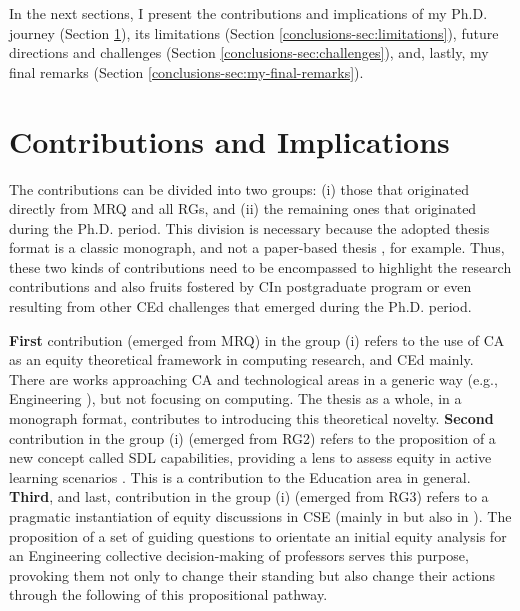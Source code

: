  In the next sections, I present the contributions and implications of my \gls{Ph.D.} journey (Section \ref{conclusions-sec:contrib-impl}), its limitations (Section \ref{conclusions-sec:limitations}), future directions and challenges (Section \ref{conclusions-sec:challenges}), and, lastly, my final remarks (Section \ref{conclusions-sec:my-final-remarks}).

 \section{Contributions and Implications}
 \label{conclusions-sec:contrib-impl}

The contributions can be divided into two groups: (i) those that originated directly from \gls{MRQ} and all \glspl{RG}, and (ii) the remaining ones that originated during the \gls{Ph.D.} period. This division is necessary because the adopted thesis format is a classic monograph, and not a paper-based thesis \cite{kubota:2021}, for example. Thus, these two kinds of contributions need to be encompassed to highlight the research contributions and also fruits fostered by \gls{CIn} postgraduate program or even resulting from other \gls{CEd} challenges that emerged during the \gls{Ph.D.} period.

\textbf{First} contribution (emerged from \gls{MRQ}) in the group (i) refers to the use of \gls{CA} as an equity theoretical framework in computing research, and \gls{CEd} mainly. There are works approaching \gls{CA} and technological areas in a generic way (e.g., Engineering \cite{fernandez:2014,odonovan:2020}), but not focusing on computing. The thesis as a whole, in a monograph format, contributes to introducing this theoretical novelty. \textbf{Second} contribution in the group (i) (emerged from \gls{RG}2) refers to the proposition of a new concept called \gls{SDL} capabilities, providing a lens to assess equity in active learning scenarios \cite{bispojr:2024-isdls}. This is a contribution to the Education area in general. \textbf{Third}, and last, contribution in the group (i) (emerged from \gls{RG}3) refers to a pragmatic instantiation of equity discussions in \gls{CSE} (mainly in \cite{bispojr:2024-online-lab} but also in \cite{bispojr:2022-educomp,bispojr:2024-nmp}). The proposition of a set of guiding
questions to orientate an initial equity analysis for an Engineering collective decision-making of professors serves this purpose, provoking them not only to change their standing but also change their actions through the following of this propositional pathway.

